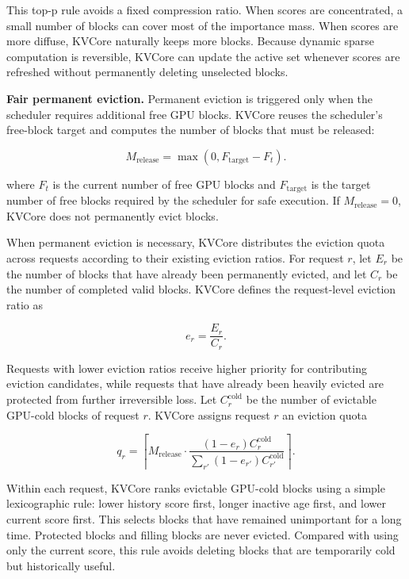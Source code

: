 \documentclass[sigplan,10pt,review,anonymous]{acmart}
\begin{document}
This top-p rule avoids a fixed compression ratio.
When scores are concentrated, a small number of blocks can cover most of the importance mass.
When scores are more diffuse, KVCore naturally keeps more blocks.
Because dynamic sparse computation is reversible, KVCore can update the active set whenever scores are refreshed without permanently deleting unselected blocks.

\noindent\textbf{Fair permanent eviction.}
Permanent eviction is triggered only when the scheduler requires additional free GPU blocks.
KVCore reuses the scheduler's free-block target and computes the number of blocks that must be released:

$$
M_{\mathrm{release}}
=
\max\left(0, F_{\mathrm{target}} - F_t\right).
$$

where $F_t$ is the current number of free GPU blocks and $F_{\mathrm{target}}$ is the target number of free blocks required by the scheduler for safe execution.
If $M_{\mathrm{release}}=0$, KVCore does not permanently evict blocks.

When permanent eviction is necessary, KVCore distributes the eviction quota across requests according to their existing eviction ratios.
For request $r$, let $E_r$ be the number of blocks that have already been permanently evicted, and let $C_r$ be the number of completed valid blocks.
KVCore defines the request-level eviction ratio as

$$
e_r = \frac{E_r}{C_r}.
$$

Requests with lower eviction ratios receive higher priority for contributing eviction candidates, while requests that have already been heavily evicted are protected from further irreversible loss.
Let $C_r^{\mathrm{cold}}$ be the number of evictable GPU-cold blocks of request $r$.
KVCore assigns request $r$ an eviction quota

$$
q_r =
\left\lceil
M_{\mathrm{release}}
\cdot
\frac{(1-e_r) C_r^{\mathrm{cold}}}
{\sum_{r'} (1-e_{r'}) C_{r'}^{\mathrm{cold}}}
\right\rceil .
$$

Within each request, KVCore ranks evictable GPU-cold blocks using a simple lexicographic rule:
lower history score first, longer inactive age first, and lower current score first.
This selects blocks that have remained unimportant for a long time.
Protected blocks and filling blocks are never evicted.
Compared with using only the current score, this rule avoids deleting blocks that are temporarily cold but historically useful.
\end{document}

